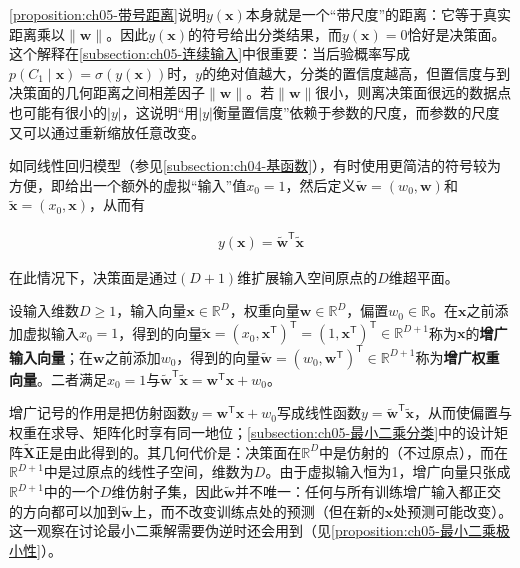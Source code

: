 \documentclass[../../main.tex]{subfiles}
\begin{document}
\begin{remark}
\cref{proposition:ch05-带号距离}说明$y(\boldsymbol{x})$本身就是一个“带尺度”的距离：它等于真实距离乘以$\lVert\boldsymbol{w}\rVert$。因此$y(\boldsymbol{x})$的符号给出分类结果，而$y(\boldsymbol{x})=0$恰好是决策面。这个解释在\cref{subsection:ch05-连续输入}中很重要：当后验概率写成$p(C_1\mid\boldsymbol{x})=\sigma(y(\boldsymbol{x}))$时，$y$的绝对值越大，分类的置信度越高，但置信度与到决策面的几何距离之间相差因子$\lVert\boldsymbol{w}\rVert$。若$\lVert\boldsymbol{w}\rVert$很小，则离决策面很远的数据点也可能有很小的$|y|$，这说明“用$|y|$衡量置信度”依赖于参数的尺度，而参数的尺度又可以通过重新缩放任意改变。
\end{remark}

如同线性回归模型（参见\cref{subsection:ch04-基函数}），有时使用更简洁的符号较为方便，即给出一个额外的虚拟“输入”值$x_0=1$，然后定义$\tilde{\boldsymbol{w}}=(w_0,\boldsymbol{w})$和$\tilde{\boldsymbol{x}}=(x_0,\boldsymbol{x})$，从而有

\begin{align}
  y(\boldsymbol{x})=\tilde{\boldsymbol{w}}^{\mathsf{T}}\tilde{\boldsymbol{x}}
  \label{align:ch05-增广判别}
\end{align}

在此情况下，决策面是通过$(D+1)$维扩展输入空间原点的$D$维超平面。

\begin{definition}[增广权重与增广输入]\label{definition:ch05-增广记号}
设输入维数$D\geqslant1$，输入向量$\boldsymbol{x}\in\mathbb{R}^{D}$，权重向量$\boldsymbol{w}\in\mathbb{R}^{D}$，偏置$w_0\in\mathbb{R}$。在$\boldsymbol{x}$之前添加虚拟输入$x_0=1$，得到的向量$\tilde{\boldsymbol{x}}=(x_0,\boldsymbol{x}^{\mathsf{T}})^{\mathsf{T}}=(1,\boldsymbol{x}^{\mathsf{T}})^{\mathsf{T}}\in\mathbb{R}^{D+1}$称为$\boldsymbol{x}$的\textbf{增广输入向量}；在$\boldsymbol{w}$之前添加$w_0$，得到的向量$\tilde{\boldsymbol{w}}=(w_0,\boldsymbol{w}^{\mathsf{T}})^{\mathsf{T}}\in\mathbb{R}^{D+1}$称为\textbf{增广权重向量}。二者满足$x_0=1$与$\tilde{\boldsymbol{w}}^{\mathsf{T}}\tilde{\boldsymbol{x}}=\boldsymbol{w}^{\mathsf{T}}\boldsymbol{x}+w_0$。
\end{definition}

\begin{remark}
增广记号的作用是把仿射函数$y=\boldsymbol{w}^{\mathsf{T}}\boldsymbol{x}+w_0$写成线性函数$y=\tilde{\boldsymbol{w}}^{\mathsf{T}}\tilde{\boldsymbol{x}}$，从而使偏置与权重在求导、矩阵化时享有同一地位；\cref{subsection:ch05-最小二乘分类}中的设计矩阵$\tilde{\boldsymbol{X}}$正是由此得到的。其几何代价是：决策面在$\mathbb{R}^{D}$中是仿射的（不过原点），而在$\mathbb{R}^{D+1}$中是过原点的线性子空间，维数为$D$。由于虚拟输入恒为1，增广向量只张成$\mathbb{R}^{D+1}$中的一个$D$维仿射子集，因此$\tilde{\boldsymbol{w}}$并不唯一：任何与所有训练增广输入都正交的方向都可以加到$\tilde{\boldsymbol{w}}$上，而不改变训练点处的预测（但在新的$\boldsymbol{x}$处预测可能改变）。这一观察在讨论最小二乘解需要伪逆时还会用到（见\cref{proposition:ch05-最小二乘极小性}）。
\end{remark}
\end{document}
